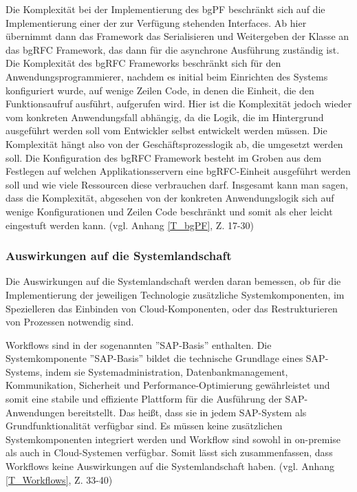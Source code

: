 Die Komplexität bei der Implementierung des bgPF beschränkt sich auf die Implementierung einer der zur Verfügung stehenden Interfaces. Ab hier übernimmt dann das Framework das Serialisieren und Weitergeben der Klasse an das bgRFC Framework, das dann für die asynchrone Ausführung zuständig ist. Die Komplexität des bgRFC Frameworks beschränkt sich für den Anwendungsprogrammierer, nachdem es initial beim Einrichten des Systems konfiguriert wurde, auf wenige Zeilen Code, in denen die Einheit, die den Funktionsaufruf ausführt, aufgerufen wird. Hier ist die Komplexität jedoch wieder vom konkreten Anwendungsfall abhängig, da die Logik, die im Hintergrund ausgeführt werden soll vom Entwickler selbst entwickelt werden müssen. Die Komplexität hängt also von der Geschäftsprozesslogik ab, die umgesetzt werden soll. Die Konfiguration des bgRFC Framework besteht im Groben aus dem Festlegen auf welchen Applikationsservern eine bgRFC-Einheit ausgeführt werden soll und wie viele Ressourcen diese verbrauchen darf. Insgesamt kann man sagen, dass die Komplexität, abgesehen von der konkreten Anwendungslogik sich auf wenige Konfigurationen und Zeilen Code beschränkt und somit als eher leicht eingestuft werden kann. (vgl. Anhang \ref{T_bgPF}, Z. 17-30)

\subsubsection{Auswirkungen auf die Systemlandschaft}

Die Auswirkungen auf die Systemlandschaft werden daran bemessen, ob für die Implementierung der jeweiligen Technologie zusätzliche Systemkomponenten, im Spezielleren das Einbinden von Cloud-Komponenten, oder das Restrukturieren von Prozessen notwendig sind.

Workflows sind in der sogenannten ''SAP-Basis'' enthalten. Die Systemkomponente ''SAP-Basis'' bildet die technische Grundlage eines SAP-Systems, indem sie Systemadministration, Datenbankmanagement, Kommunikation, Sicherheit und Performance-Optimierung gewährleistet und somit eine stabile und effiziente Plattform für die Ausführung der SAP-Anwendungen bereitstellt. Das hei{\ss}t, dass sie in jedem SAP-System als Grundfunktionalität verfügbar sind. Es müssen keine zusätzlichen Systemkomponenten integriert werden und Workflow sind sowohl in on-premise als auch in Cloud-Systemen verfügbar. Somit lässt sich zusammenfassen, dass Workflows keine Auswirkungen auf die Systemlandschaft haben. (vgl. Anhang \ref{T_Workflows}, Z. 33-40)


